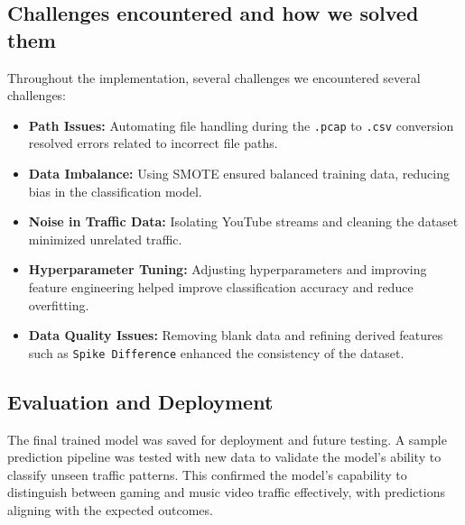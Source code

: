 \subsection{Challenges encountered and how we solved them}
Throughout the implementation, several challenges we encountered several challenges:
\begin{itemize}
    \item \textbf{Path Issues:} Automating file handling during the \texttt{.pcap} to \texttt{.csv} conversion resolved errors related to incorrect file paths.
    \item \textbf{Data Imbalance:} Using SMOTE ensured balanced training data, reducing bias in the classification model.
    \item \textbf{Noise in Traffic Data:} Isolating YouTube streams and cleaning the dataset minimized unrelated traffic.
    \item \textbf{Hyperparameter Tuning:} Adjusting hyperparameters and improving feature engineering helped improve classification accuracy and reduce overfitting.
    \item \textbf{Data Quality Issues:} Removing blank data and refining derived features such as \texttt{Spike Difference} enhanced the consistency of the dataset.
\end{itemize}

\subsection{Evaluation and Deployment}
The final trained model was saved for deployment and future testing. A sample prediction pipeline was tested with new data to validate the model's ability to classify unseen traffic patterns. This confirmed the model's capability to distinguish between gaming and music video traffic effectively, with predictions aligning with the expected outcomes.
